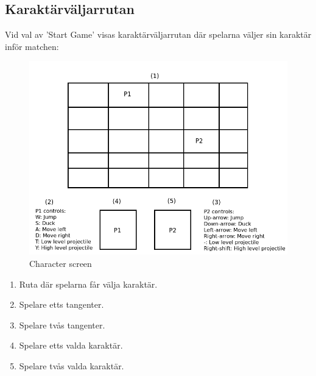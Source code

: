 \documentclass{TDP003mall}
\begin{document}
\subsection{Karaktärväljarrutan}
Vid val av 'Start Game' visas karaktärväljarrutan där spelarna väljer sin karaktär inför matchen:
\begin{figure}[H]
    \centering
    \includegraphics[width = \linewidth]{characterscreen.png}
    \caption{Character screen}
    \label{fig:Character screen}
\end{figure}
\begin{enumerate}
\item Ruta där spelarna får välja karaktär.
\item Spelare etts tangenter.
\item Spelare tvås tangenter.
\item Spelare etts valda karaktär.
\item Spelare tvås valda karaktär.
\end{enumerate}
\end{document}
